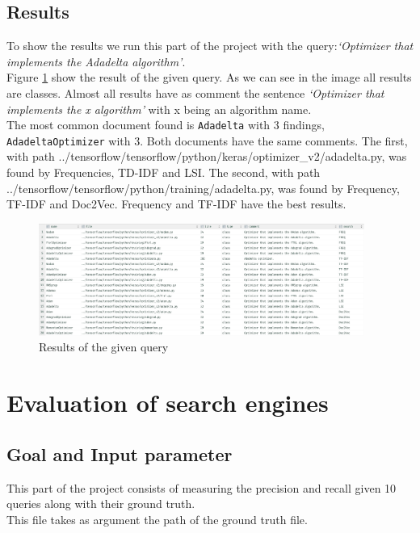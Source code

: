 \documentclass [14 pt]{article}
\begin{document}
\subsection{Results} %
To show the results we run this part of the project with the query:\emph{`Optimizer that implements the Adadelta algorithm'}.\\
Figure \ref{fig:Part2} show the result of the given query.
As we can see in the image all results are classes. Almost all results have as comment the sentence \emph{`Optimizer that implements the x algorithm'} with x being an algorithm name.\\
The most common document found is \texttt{Adadelta} with 3 findings, \texttt{AdadeltaOptimizer} with 3. Both documents have the same comments. The first, with path ../tensorflow/tensorflow/python/keras/optimizer\_v2/adadelta.py, was found by Frequencies, TD-IDF and LSI. The second, with path ../tensorflow/tensorflow/python/training/adadelta.py, was found by Frequency, TF-IDF and Doc2Vec. Frequency and TF-IDF have the best results.
\begin{figure}[h]
\centering
\includegraphics[width=0.95\textwidth]{../res/part2.png}
\caption{Results of the given query}\label{fig:Part2}
\end{figure}


\section{Evaluation of search engines} %
\subsection{Goal and Input parameter} %
This part of the project consists of measuring the precision and recall given 10 queries along with their ground truth.\\
This file takes as argument the path of the ground truth file.
\end{document}
